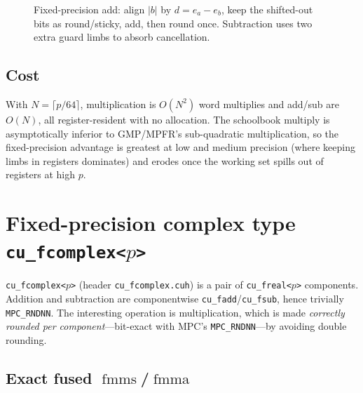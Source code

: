 \documentclass[11pt,a4paper]{article}
\newcommand{\code}[1]{\texttt{#1}}
\newcommand{\PB}{\ensuremath{p}}
\newcommand{\Nlimb}{\ensuremath{N}}
\newcommand{\fmma}{\ensuremath{\operatorname{fmma}}}
\newcommand{\fmms}{\ensuremath{\operatorname{fmms}}}
\begin{document}
\begin{figure}[h]
\centering
{}
\caption{Fixed-precision add: align $|b|$ by $d=e_a-e_b$, keep the shifted-out
bits as round/sticky, add, then round once. Subtraction uses two extra guard
limbs to absorb cancellation.}
\label{fig:add}
\end{figure}

\subsection{Cost}
With $\Nlimb=\lceil\PB/64\rceil$, multiplication is $O(\Nlimb^2)$ word
multiplies and add/sub are $O(\Nlimb)$, all register-resident with no allocation.
The schoolbook multiply is asymptotically inferior to GMP/MPFR's
sub-quadratic multiplication, so the fixed-precision advantage is greatest at
low and medium precision (where keeping limbs in registers dominates) and erodes
once the working set spills out of registers at high \PB.


\section{Fixed-precision complex type \texorpdfstring{\code{cu\_fcomplex<\PB>}}{cu\_fcomplex<PB>}}
\label{sec:fcomplex}

\code{cu\_fcomplex<\PB>} (header \code{cu\_fcomplex.cuh}) is a pair of
\code{cu\_freal<\PB>} components. Addition and subtraction are componentwise
\code{cu\_fadd}/\code{cu\_fsub}, hence trivially \code{MPC\_RNDNN}. The
interesting operation is multiplication, which is made \emph{correctly rounded per
component}---bit-exact with MPC's \code{MPC\_RNDNN}---by avoiding double rounding.

\subsection{Exact fused \texorpdfstring{$\fmms$/$\fmma$}{fmms/fmma}}
\label{sec:fmms}
\end{document}
